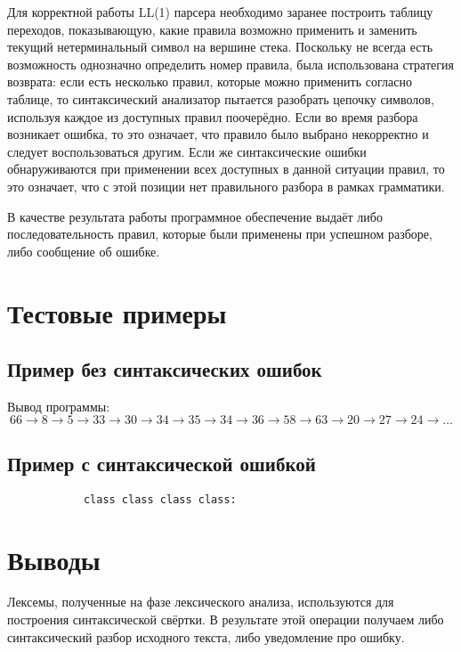 \documentclass[a4paper,10pt,notitlepage,pdftex]{scrreprt}
\begin{document}
    Для корректной работы LL(1) парсера необходимо заранее построить таблицу переходов, показывающую, какие правила
    возможно применить и заменить текущий нетерминальный символ на вершине стека.
    Поскольку не всегда есть возможность однозначно определить номер правила, была использована стратегия возврата:
    если есть несколько правил, которые можно применить согласно таблице, то синтаксический анализатор пытается
    разобрать цепочку символов, используя каждое из доступных правил поочерёдно.
    Если во время разбора возникает ошибка, то это означает, что правило было выбрано некорректно и следует
    воспользоваться другим.
    Если же синтаксические ошибки обнаруживаются при применении всех доступных в данной ситуации правил, то это
    означает, что с этой позиции нет правильного разбора в рамках грамматики.

    В качестве результата работы программное обеспечение выдаёт либо последовательность правил, которые были применены
    при успешном разборе, либо сообщение об ошибке.

\chapter{Тестовые примеры}
\label{chap:fourth}
    \section{Пример без синтаксических ошибок}
    \label{sec:ex1}
        
        Вывод программы:
        \[
            66 \rightarrow 8 \rightarrow 5 \rightarrow 33 \rightarrow 30 \rightarrow 34 \rightarrow 35 \rightarrow 34 \rightarrow 36 \rightarrow 58 \rightarrow 63 \rightarrow 20 \rightarrow 27 \rightarrow 24 \rightarrow \dots
        \]

    \section{Пример с синтаксической ошибкой}
    \label{sec:ex2}
        \begin{lstlisting}
            class class class class:
        \end{lstlisting}
\chapter{Выводы}
\label{chap:concl}
    Лексемы, полученные на фазе лексического анализа, используются для построения синтаксической свёртки.
    В результате этой операции получаем либо синтаксический разбор исходного текста, либо уведомление про ошибку.
\end{document}
